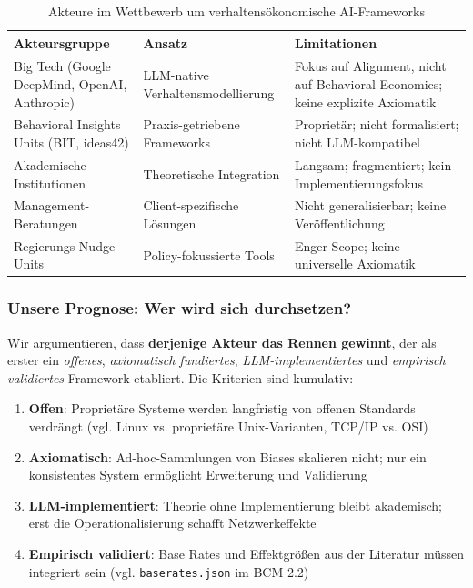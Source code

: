 \begin{table}[h]
\centering
\caption{Akteure im Wettbewerb um verhaltensökonomische AI-Frameworks}
\label{tab:competitors}
\begin{tabular}{@{}p{3cm}p{4cm}p{5cm}@{}}
\toprule
\textbf{Akteursgruppe} & \textbf{Ansatz} & \textbf{Limitationen} \\
\midrule
Big Tech (Google DeepMind, OpenAI, Anthropic) & LLM-native Verhaltensmodellierung & Fokus auf Alignment, nicht auf Behavioral Economics; keine explizite Axiomatik \\
\addlinespace
Behavioral Insights Units (BIT, ideas42) & Praxis-getriebene Frameworks & Proprietär; nicht formalisiert; nicht LLM-kompatibel \\
\addlinespace
Akademische Institutionen & Theoretische Integration & Langsam; fragmentiert; kein Implementierungsfokus \\
\addlinespace
Management-Beratungen & Client-spezifische Lösungen & Nicht generalisierbar; keine Veröffentlichung \\
\addlinespace
Regierungs-Nudge-Units & Policy-fokussierte Tools & Enger Scope; keine universelle Axiomatik \\
\bottomrule
\end{tabular}
\end{table}

\subsubsection{Unsere Prognose: Wer wird sich durchsetzen?}

Wir argumentieren, dass \textbf{derjenige Akteur das Rennen gewinnt}, der als erster ein \textit{offenes}, \textit{axiomatisch fundiertes}, \textit{LLM-implementiertes} und \textit{empirisch validiertes} Framework etabliert. Die Kriterien sind kumulativ:

\begin{enumerate}[label=(\alph*)]
    \item \textbf{Offen}: Proprietäre Systeme werden langfristig von offenen Standards verdrängt (vgl. Linux vs. proprietäre Unix-Varianten, TCP/IP vs. OSI)
    \item \textbf{Axiomatisch}: Ad-hoc-Sammlungen von Biases skalieren nicht; nur ein konsistentes System ermöglicht Erweiterung und Validierung
    \item \textbf{LLM-implementiert}: Theorie ohne Implementierung bleibt akademisch; erst die Operationalisierung schafft Netzwerkeffekte
    \item \textbf{Empirisch validiert}: Base Rates und Effektgrößen aus der Literatur müssen integriert sein (vgl. \texttt{baserates.json} im BCM 2.2)
\end{enumerate}

